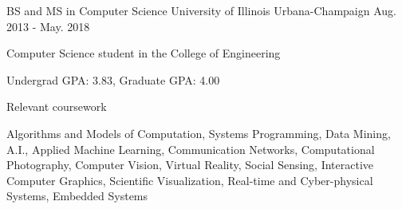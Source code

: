 

\begin{cventries}

  \cventry
    {BS and MS in Computer Science} %
    {University of Illinois} %
    {Urbana-Champaign} %
    {Aug. 2013 - May. 2018} %
    {
      \begin{cvitems} %
        \item {Computer Science student in the College of Engineering}
        \item {Undergrad GPA: 3.83, Graduate GPA: 4.00}
      \end{cvitems}
    }

  \cventry
    {Relevant coursework} %
    {} %
    {} %
    {} %
    {
      \begin{cvitems} %
        \item {Algorithms and Models of Computation, Systems Programming, Data Mining, A.I., Applied Machine Learning, Communication Networks, Computational Photography, Computer Vision, Virtual Reality, Social Sensing, Interactive Computer Graphics, Scientific Visualization, Real-time and Cyber-physical Systems, Embedded Systems}
      \end{cvitems}
    }

\end{cventries}
